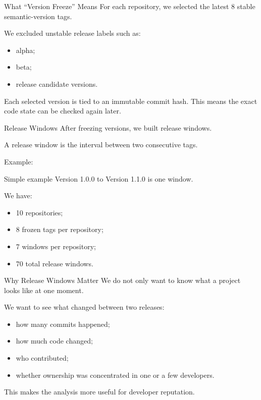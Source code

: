 \documentclass[aspectratio=169,11pt]{beamer}
\begin{document}
\begin{frame}{What ``Version Freeze'' Means}
  For each repository, we selected the latest 8 stable semantic-version tags.

  \vspace{0.2cm}
  We excluded unstable release labels such as:
  \begin{itemize}
    \item alpha;
    \item beta;
    \item release candidate versions.
  \end{itemize}

  \vspace{0.3cm}
  Each selected version is tied to an immutable commit hash. This means the exact code state can be checked again later.
\end{frame}

\begin{frame}{Release Windows}
  After freezing versions, we built release windows.

  \vspace{0.2cm}
  A release window is the interval between two consecutive tags.

  \vspace{0.3cm}
  Example:
  \begin{block}{Simple example}
    Version 1.0.0 to Version 1.1.0 is one window.
  \end{block}

  \vspace{0.3cm}
  We have:
  \begin{itemize}
    \item 10 repositories;
    \item 8 frozen tags per repository;
    \item 7 windows per repository;
    \item 70 total release windows.
  \end{itemize}
\end{frame}

\begin{frame}{Why Release Windows Matter}
  We do not only want to know what a project looks like at one moment.

  \vspace{0.2cm}
  We want to see what changed between two releases:
  \begin{itemize}
    \item how many commits happened;
    \item how much code changed;
    \item who contributed;
    \item whether ownership was concentrated in one or a few developers.
  \end{itemize}

  \vspace{0.3cm}
  This makes the analysis more useful for developer reputation.
\end{frame}
\end{document}
